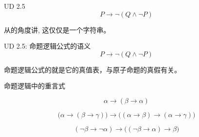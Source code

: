 
\begin{frame}{}
\end{frame}

\begin{frame}{}
  \begin{exampleblock}{UD 2.5}
    \[
      P \to \lnot (Q \land \lnot P)
    \]
  \end{exampleblock}

  \begin{center}
    从的角度讲, 这仅仅是一个字符串。
  \end{center}
\end{frame}

\begin{frame}{}
  \begin{exampleblock}{UD 2.5: 命题逻辑公式的语义}
    \[
      P \to \lnot (Q \land \lnot P)
    \]

    \vspace{0.40cm}
    \begin{center}
      {}
    \end{center}
  \end{exampleblock}

  \vspace{0.60cm}
  \begin{center}
    命题逻辑公式的就是它的真值表，与原子命题的真假有关。\\[20pt]

    \pause
  \end{center}
\end{frame}

\begin{frame}{}
  \begin{center}
    命题逻辑中的重言式
  \end{center}

  \[
    \alpha \to (\beta \to \alpha)
  \]

  \[
    \big(\alpha \to (\beta \to \gamma)\big) \to \big((\alpha \to \beta) \to (\alpha \to \gamma)\big)
  \]

  \[
    (\lnot \beta \to \lnot \alpha) \to \big((\lnot \beta \to \alpha) \to \beta \big)
  \]
\end{frame}

